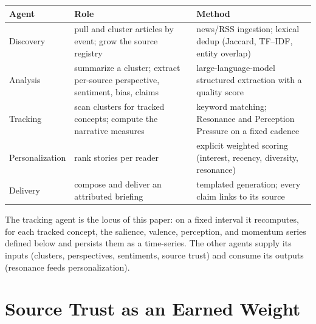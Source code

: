 \documentclass[11pt,a4paper]{article}
\theoremstyle{definition}
\begin{document}
\begin{center}\small
\renewcommand{\arraystretch}{1.25}
\setlength{\tabcolsep}{5pt}
\begin{tabular}{>{\raggedright\arraybackslash}p{1.9cm} >{\raggedright\arraybackslash}p{6.6cm} >{\raggedright\arraybackslash}p{5.8cm}}
\hline
\textbf{Agent} & \textbf{Role} & \textbf{Method} \\
\hline
Discovery & pull and cluster articles by event; grow the source registry &
  news/RSS ingestion; lexical dedup (Jaccard, TF--IDF, entity overlap) \\
Analysis & summarize a cluster; extract per-source perspective, sentiment, bias, claims &
  large-language-model structured extraction with a quality score \\
Tracking & scan clusters for tracked concepts; compute the narrative measures &
  keyword matching; Resonance and Perception Pressure on a fixed cadence \\
Personal\-ization & rank stories per reader &
  explicit weighted scoring (interest, recency, diversity, resonance) \\
Delivery & compose and deliver an attributed briefing &
  templated generation; every claim links to its source \\
\hline
\end{tabular}
\end{center}

The tracking agent is the locus of this paper: on a fixed interval it recomputes, for each tracked
concept, the salience, valence, perception, and momentum series defined below and persists them as a
time-series. The other agents supply its inputs (clusters, perspectives, sentiments, source trust)
and consume its outputs (resonance feeds personalization).

\section{Source Trust as an Earned Weight}
\label{sec:trust}
\end{document}
